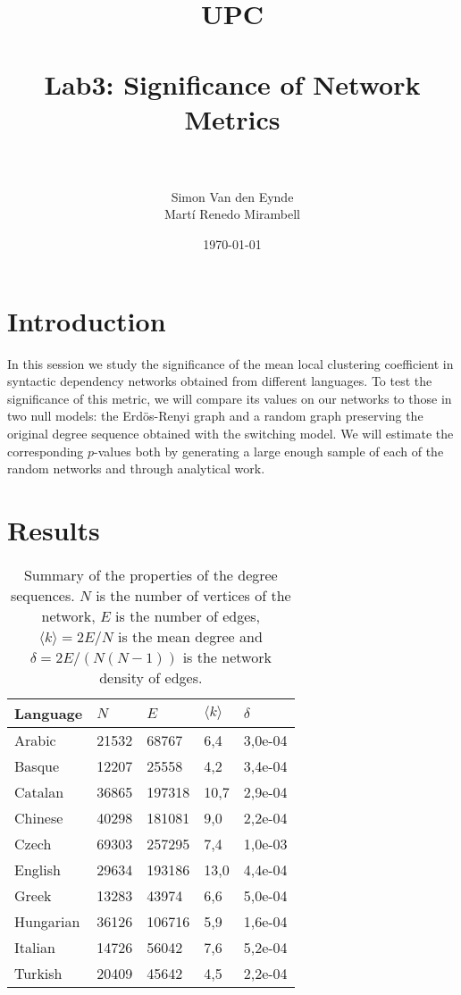 \documentclass[paper=a4, fontsize=11pt]{scrartcl} %
\title{	
\normalfont \normalsize 
\textsc{UPC} \\ [25pt] %
\horrule{0.5pt} \\[0.4cm] %
\huge Lab3: Significance of Network Metrics \\ %
\horrule{2pt} \\[0.5cm] %
}
\author{Simon Van den Eynde\\ Martí Renedo Mirambell} %
\date{\normalsize\today} %
\begin{document}
\maketitle %



\section{Introduction}
In this session we study the significance of the mean local clustering coefficient in syntactic dependency networks obtained from different languages. To test the significance of this metric, we will compare its values on our networks to those in two null models: the Erdös-Renyi graph and a random graph preserving the original degree sequence obtained with the switching model.  We will estimate the corresponding $p$-values both by generating a large enough sample of each of the random networks and through analytical work.

\section{Results}






\begin{table}[]
\centering
\caption{Summary of the properties of the degree sequences. $N$ is the number of vertices of the network, $E$ is the number of edges, $\langle k\rangle=2E/N$ is the mean degree and $\delta=2E/(N(N-1))$ is the network density of edges.}
\label{table1}
\begin{tabular}{l|llll}
Language	& $N$		& $E$		& $\langle k\rangle$	& $\delta$ \\ \hline
Arabic 	& 21532	&  68767 	&  6,4 			& 3,0e-04 \\ 
Basque  	& 12207 	& 25558   	& 4,2  			& 3,4e-04 \\
Catalan  	& 36865 	& 197318 	& 10,7 			& 2,9e-04 \\
Chinese 	&40298 	& 181081 	&  9,0 			& 2,2e-04 \\
Czech 	& 69303	& 257295 	& 7,4 				& 1,0e-03 \\
English 	& 29634 	& 193186  	& 13,0 			& 4,4e-04 \\
Greek  	& 13283  	& 43974  	&  6,6  			& 5,0e-04 \\
Hungarian  	& 36126 	& 106716  	& 5,9  			& 1,6e-04 \\
Italian  	& 14726  	& 56042   	& 7,6  			& 5,2e-04 \\
Turkish  	& 20409  	& 45642  	& 4,5 				& 2,2e-04
\end{tabular}
\end{table}
\end{document}

